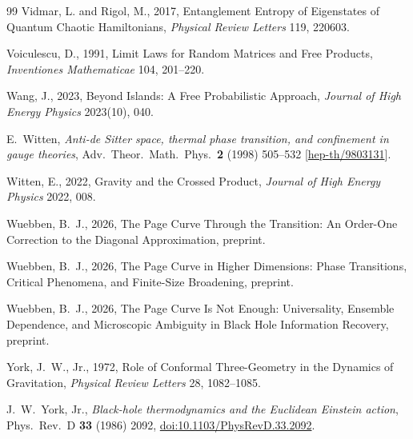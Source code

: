 \documentclass[11pt,letterpaper]{article}
\theoremstyle{plain}
\theoremstyle{definition}
\theoremstyle{remark}
\begin{document}
\begin{thebibliography}{99}
Vidmar, L. and Rigol, M., 2017, Entanglement Entropy of Eigenstates of Quantum Chaotic Hamiltonians, \textit{Physical Review Letters} 119, 220603.

Voiculescu, D., 1991, Limit Laws for Random Matrices and Free Products, \textit{Inventiones Mathematicae} 104, 201--220.

Wang, J., 2023, Beyond Islands: A Free Probabilistic Approach, \textit{Journal of High Energy Physics} 2023(10), 040.

E.~Witten, \emph{Anti-de Sitter space, thermal phase transition, and confinement in gauge theories},
Adv.\ Theor.\ Math.\ Phys.\ \textbf{2} (1998) 505--532
[\href{https://arxiv.org/abs/hep-th/9803131}{hep-th/9803131}].

Witten, E., 2022, Gravity and the Crossed Product, \textit{Journal of High Energy Physics} 2022, 008.

Wuebben, B.~J., 2026, The Page Curve Through the Transition: An Order-One Correction to the Diagonal Approximation, preprint.

Wuebben, B.~J., 2026, The Page Curve in Higher Dimensions: Phase Transitions, Critical Phenomena, and Finite-Size Broadening, preprint.

Wuebben, B.~J., 2026, The Page Curve Is Not Enough: Universality, Ensemble Dependence, and Microscopic Ambiguity in Black Hole Information Recovery, preprint.

York, J.~W., Jr., 1972, Role of Conformal Three-Geometry in the Dynamics of Gravitation, \textit{Physical Review Letters} 28, 1082--1085.

J.~W.~York, Jr., \emph{Black-hole thermodynamics and the Euclidean Einstein action},
Phys.\ Rev.\ D \textbf{33} (1986) 2092,
\href{https://doi.org/10.1103/PhysRevD.33.2092}{doi:10.1103/PhysRevD.33.2092}.

\end{thebibliography}
\end{document}
